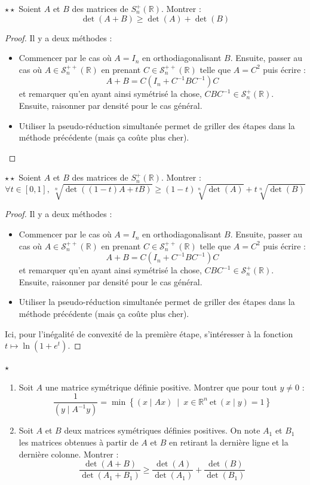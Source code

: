 \documentclass[french,a4paper]{article}
\newcommand{\R}{\mathbb{R}}
\newcommand{\inv}{^{-1}}
\theoremstyle{plain}
\theoremstyle{definition}
\theoremstyle{remark}
\begin{document}
\begin{ex}{$\star\star$}
	Soient $A$ et $B$ des matrices de $S_n^+(\R)$. Montrer : $$\det(A+B)\geqslant \det(A)+\det(B)$$
\end{ex}
\begin{proof}
	Il y a deux méthodes :
	\begin{itemize}
		\item Commencer par le cas où $A=I_n$ en orthodiagonalisant $B$. Ensuite, passer au cas où $A\in\mathcal{S}_n^{++}(\R)$ en prenant $C\in\mathcal{S}_n^{++}(\R)$ telle que $A=C^2$ puis écrire : $$A+B=C(I_n+C\inv BC\inv)C$$ et remarquer qu'en ayant ainsi symétrisé la chose, $CBC\inv\in\mathcal{S}_n^{+}(\R)$. Ensuite, raisonner par densité pour le cas général.
		\item Utiliser la pseudo-réduction simultanée permet de griller des étapes dans la méthode précédente (mais ça coûte plus cher).
	\end{itemize}
\end{proof}

\begin{ex}{$\star\star$}
	Soient $A$ et $B$ des matrices de $S_n^+(\R)$. Montrer : $$\forall t\in[0,1],\ \sqrt[n]{\det((1-t)A+tB)}\geqslant(1-t)\sqrt[n]{\det(A)}+t\sqrt[n]{\det(B)}$$
\end{ex}
\begin{proof}
	Il y a deux méthodes :
	\begin{itemize}
		\item Commencer par le cas où $A=I_n$ en orthodiagonalisant $B$. Ensuite, passer au cas où $A\in\mathcal{S}_n^{++}(\R)$ en prenant $C\in\mathcal{S}_n^{++}(\R)$ telle que $A=C^2$ puis écrire : $$A+B=C(I_n+C\inv BC\inv)C$$ et remarquer qu'en ayant ainsi symétrisé la chose, $CBC\inv\in\mathcal{S}_n^{+}(\R)$. Ensuite, raisonner par densité pour le cas général.
		\item Utiliser la pseudo-réduction simultanée permet de griller des étapes dans la méthode précédente (mais ça coûte plus cher).
	\end{itemize}
	Ici, pour l'inégalité de convexité de la première étape, s'intéresser à la fonction $t\mapsto \ln(1+e^t)$.
\end{proof}

\begin{ex}{$\star$}
	\begin{enumerate}
		\item Soit $A$ une matrice symétrique définie positive. Montrer que pour tout $y\ne 0$ : $$\frac{1}{(y\mid A\inv y)}=\min\left\{(x\mid Ax)\ \mid\ x\in\R^n\ \text{et}\ (x\mid y)=1\right\}$$
		\item Soit $A$ et $B$ deux matrices symétriques définies positives. On note $A_1$ et $B_1$ les matrices obtenues à partir de $A$ et $B$ en retirant la dernière ligne et la dernière colonne. Montrer : $$\frac{\det(A+B)}{\det(A_1+B_1)}\geqslant\frac{\det(A)}{\det(A_1)}+\frac{\det(B)}{\det(B_1)}$$
	\end{enumerate}
\end{ex}
\end{document}
